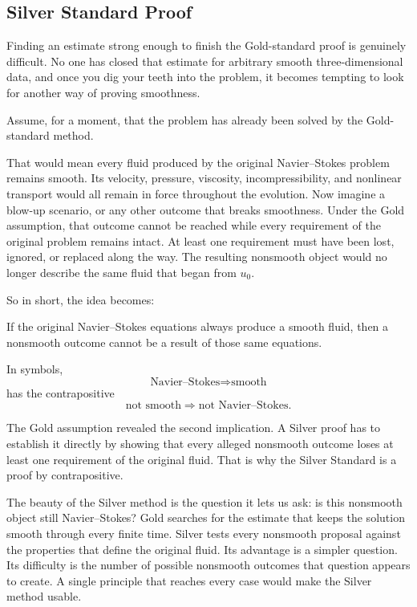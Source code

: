 \subsection{Silver Standard Proof}\label{sub:SilverStandardProof}

Finding an estimate strong enough to finish the Gold-standard proof is genuinely difficult.
No one has closed that estimate for arbitrary smooth three-dimensional data, and once you dig your teeth into the problem, it becomes tempting to look for another way of proving smoothness.

Assume, for a moment, that the problem has already been solved by the Gold-standard method.

That would mean every fluid produced by the original Navier--Stokes problem remains smooth.
Its velocity, pressure, viscosity, incompressibility, and nonlinear transport would all remain in force throughout the evolution.
Now imagine a blow-up scenario, or any other outcome that breaks smoothness.
Under the Gold assumption, that outcome cannot be reached while every requirement of the original problem remains intact.
At least one requirement must have been lost, ignored, or replaced along the way.
The resulting nonsmooth object would no longer describe the same fluid that began from \(u_0\).

So in short, the idea becomes:

If the original Navier--Stokes equations always produce a smooth fluid, then a nonsmooth outcome cannot be a result of those same equations.

In symbols,
\[
  \text{Navier--Stokes}
  \Longrightarrow
  \text{smooth}
\]
has the contrapositive
\[
  \text{not smooth}
  \Longrightarrow
  \text{not Navier--Stokes}.
\]

The Gold assumption revealed the second implication.
A Silver proof has to establish it directly by showing that every alleged nonsmooth outcome loses at least one requirement of the original fluid.
That is why the Silver Standard is a proof by contrapositive.

The beauty of the Silver method is the question it lets us ask: is this nonsmooth object still Navier--Stokes?
Gold searches for the estimate that keeps the solution smooth through every finite time.
Silver tests every nonsmooth proposal against the properties that define the original fluid.
Its advantage is a simpler question.
Its difficulty is the number of possible nonsmooth outcomes that question appears to create.
A single principle that reaches every case would make the Silver method usable.
